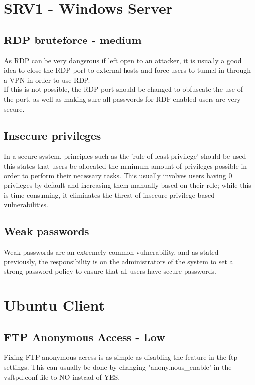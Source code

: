 \documentclass{report}
\begin{document}
\section{SRV1 - Windows Server}
\subsection{RDP bruteforce - medium}
As RDP can be very dangerous if left open to an attacker, it is usually a good idea to close the RDP port to external hosts and force users to tunnel in through a VPN in order to use RDP.\\ If this is not possible, the RDP port should be changed to obfuscate the use of the port, as well as making sure all passwords for RDP-enabled users are very secure.
\subsection{Insecure privileges}
In a secure system, principles such as the 'rule of least privilege' should be used - this states that users be allocated the minimum amount of privileges possible in order to perform their necessary tasks. This usually involves users having 0 privileges by default and increasing them manually based on their role; while this is time consuming, it eliminates the threat of insecure privilege based vulnerabilities.
\subsection{Weak passwords}
Weak passwords are an extremely common vulnerability, and as stated previously, the responsibility is on the administrators of the system to set a strong password policy to ensure that all users have secure passwords.

\section{Ubuntu Client}
\subsection{FTP Anonymous Access - Low}
Fixing FTP anonymous access is as simple as disabling the feature in the ftp settings. This can usually be done by changing "anonymous\_enable" in the vsftpd.conf file to NO instead of YES.
\end{document}
